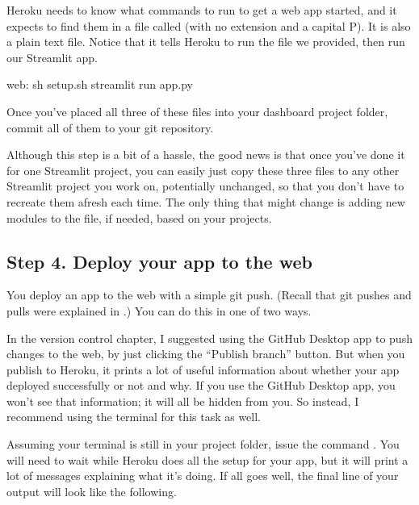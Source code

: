 \documentclass[letterpaper,10pt,english]{jupyterBook}
\begin{document}
\sphinxAtStartPar
{} Heroku needs to know what commands to run to get a web app started, and it expects to find them in a file called  (with no extension and a capital P).  It is also a plain text file.  Notice that it tells Heroku to run the  file we provided, then run our Streamlit app.

\begin{sphinxVerbatim}[commandchars=\\\{\}]
web: sh setup.sh  streamlit run app.py
\end{sphinxVerbatim}

\sphinxAtStartPar
Once you’ve placed all three of these files into your dashboard project folder, commit all of them to your git repository.

\sphinxAtStartPar
Although this step is a bit of a hassle, the good news is that once you’ve done it for one Streamlit project, you can easily just copy these three files to any other Streamlit project you work on, potentially unchanged, so that you don’t have to recreate them afresh each time.  The only thing that might change is adding new modules to the  file, if needed, based on your projects.


\subsection{Step 4. Deploy your app to the web}
\label{\detokenize{chapter-14-dashboards:step-4-deploy-your-app-to-the-web}}
\sphinxAtStartPar
You deploy an app to the web with a simple git push.  (Recall that git pushes and pulls were explained in .)  You can do this in one of two ways.

\sphinxAtStartPar
In the version control chapter, I suggested using the GitHub Desktop app to push changes to the web, by just clicking the “Publish branch” button.  But when you publish to Heroku, it prints a lot of useful information about whether your app deployed successfully or not and why.  If you use the GitHub Desktop app, you won’t see that information; it will all be hidden from you.  So instead, I recommend using the terminal for this task as well.

\sphinxAtStartPar
Assuming your terminal is still in your project folder, issue the command .  You will need to wait while Heroku does all the setup for your app, but it will print a lot of messages explaining what it’s doing.  If all goes well, the final line of your output will look like the following.
\end{document}
